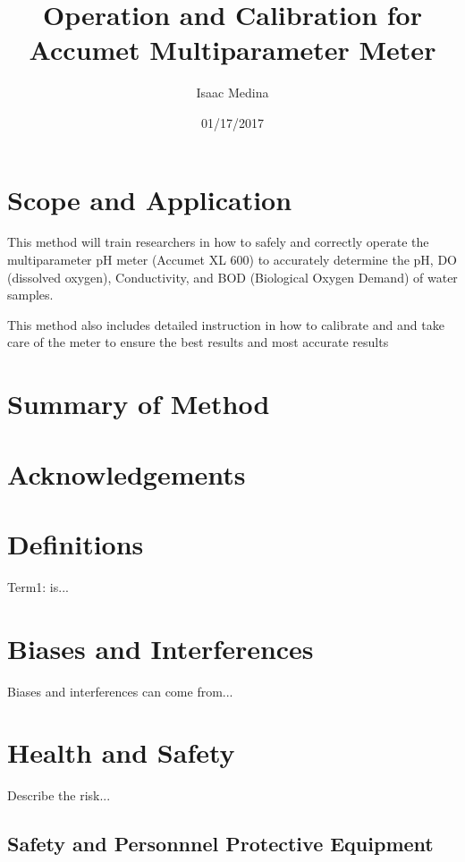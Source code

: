 \documentclass[12pt]{../SOP3_beta}
\title{Operation and Calibration for Accumet Multiparameter Meter}
\date{01/17/2017}
\author{Isaac Medina}
\begin{document}


\maketitle

\section{Scope and Application}

\NP This method will train researchers in how to safely and correctly operate the multiparameter pH meter (Accumet XL 600) to accurately determine the pH, DO (dissolved oxygen), Conductivity, and BOD (Biological Oxygen Demand) of water samples. 

\NP This method also includes detailed instruction in how to calibrate and and take care of the meter to ensure the best results and most accurate results

\section{Summary of Method}


\tableofcontents

\newpage

\section{Acknowledgements}

\section{Definitions}

\NP Term1: is...

\section{Biases and Interferences}

\NP Biases and interferences can come from...

\section{Health and Safety}

\NP Describe the risk...


\subsection{Safety and Personnnel Protective Equipment}
\end{document}
